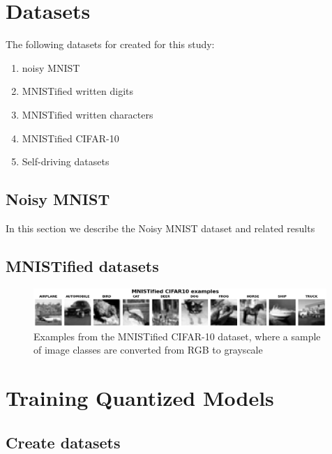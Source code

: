 

\section{Datasets}

The following datasets for created for this study:
\begin{enumerate}
    \item noisy MNIST
    \item MNISTified written digits
    \item MNISTified written characters
    \item MNISTified CIFAR-10
    \item Self-driving datasets
\end{enumerate}



\subsection{Noisy MNIST}

In this section we describe the Noisy MNIST dataset and related results

\subsection{MNISTified datasets}

\begin{figure}[h]
\centering
\includegraphics[width=0.99\textwidth]{Figures/Results/mnistified_cifar10.png}
\caption{Examples from the MNISTified CIFAR-10 dataset, where a sample of image classes are converted from RGB to grayscale}
\label{fig:mnistified_cifar10}
\end{figure}


\section{Training Quantized Models}

\subsection{Create datasets}

